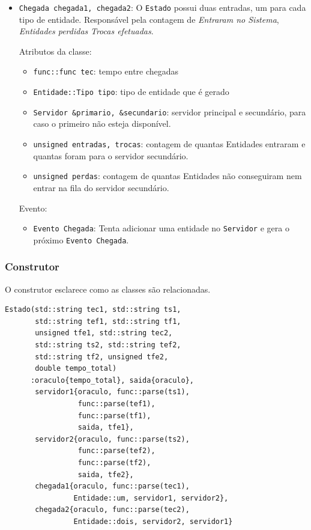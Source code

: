\documentclass{article}
\begin{document}
\begin{itemize}
  \item \texttt{Chegada chegada1, chegada2}: O \texttt{Estado} possui duas entradas, um
    para cada tipo de entidade. Responsável pela contagem de \textit{Entraram no Sistema}, \textit{Entidades perdidas}  \textit{Trocas efetuadas}.

    Atributos da classe:
   \begin{itemize}
     \item \texttt{func::func tec}: tempo entre chegadas
     \item \texttt{Entidade::Tipo tipo}: tipo de entidade que é gerado
     \item \texttt{Servidor \&primario, \&secundario}: servidor principal e secundário,
       para caso o primeiro não esteja disponível.
     \item \texttt{unsigned entradas, trocas}: contagem de quantas Entidades entraram e quantas foram para o servidor secundário.
     \item \texttt{unsigned perdas}: contagem de quantas Entidades não conseguiram nem entrar na fila do servidor secundário.
   \end{itemize}
 
    Evento:
    \begin{itemize}
      \item \texttt{Evento Chegada}: Tenta adicionar uma entidade no \texttt{Servidor} e 
        gera o próximo \texttt{Evento Chegada}.
    \end{itemize}
\end{itemize}

\subsubsection{Construtor}
O construtor esclarece como as classes são relacionadas.
\lstset{language=C++}  
\begin{lstlisting}[frame=single]  
Estado(std::string tec1, std::string ts1,
       std::string tef1, std::string tf1,
       unsigned tfe1, std::string tec2,
       std::string ts2, std::string tef2,
       std::string tf2, unsigned tfe2,
       double tempo_total)
      :oraculo{tempo_total}, saida{oraculo},
       servidor1{oraculo, func::parse(ts1),
                 func::parse(tef1),
                 func::parse(tf1),
                 saida, tfe1},
       servidor2{oraculo, func::parse(ts2),
                 func::parse(tef2),
                 func::parse(tf2),
                 saida, tfe2},
       chegada1{oraculo, func::parse(tec1),
                Entidade::um, servidor1, servidor2},
       chegada2{oraculo, func::parse(tec2),
                Entidade::dois, servidor2, servidor1}
\end{lstlisting}
\end{document}
